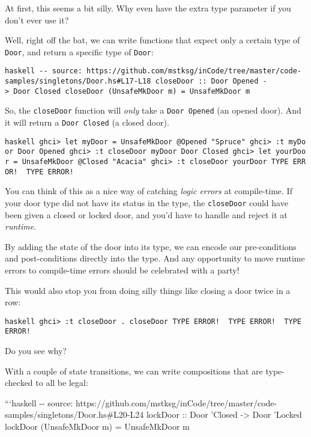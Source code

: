 \documentclass[]{article}
\begin{document}
At first, this seems a bit silly. Why even have the extra type parameter if you
don't ever use it?

Well, right off the bat, we can write functions that expect only a certain type
of \texttt{Door}, and return a specific type of \texttt{Door}:

\texttt{haskell\ -\/-\ source:\ https://github.com/mstksg/inCode/tree/master/code-samples/singletons/Door.hs\#L17-L18\ closeDoor\ ::\ Door\ \textquotesingle{}Opened\ -\textgreater{}\ Door\ \textquotesingle{}Closed\ closeDoor\ (UnsafeMkDoor\ m)\ =\ UnsafeMkDoor\ m}

So, the \texttt{closeDoor} function will \emph{only} take a
\texttt{Door\ \textquotesingle{}Opened} (an opened door). And it will return a
\texttt{Door\ \textquotesingle{}Closed} (a closed door).

\texttt{haskell\ ghci\textgreater{}\ let\ myDoor\ =\ UnsafeMkDoor\ @\textquotesingle{}Opened\ "Spruce"\ ghci\textgreater{}\ :t\ myDoor\ Door\ \textquotesingle{}Opened\ ghci\textgreater{}\ :t\ closeDoor\ myDoor\ Door\ \textquotesingle{}Closed\ ghci\textgreater{}\ let\ yourDoor\ =\ UnsafeMkDoor\ @\textquotesingle{}Closed\ "Acacia"\ ghci\textgreater{}\ :t\ closeDoor\ yourDoor\ TYPE\ ERROR!\ \ TYPE\ ERROR!}

You can think of this as a nice way of catching \emph{logic errors} at
compile-time. If your door type did not have its status in the type, the
\texttt{closeDoor} could have been given a closed or locked door, and you'd have
to handle and reject it at \emph{runtime}.

By adding the state of the door into its type, we can encode our pre-conditions
and post-conditions directly into the type. And any opportunity to move runtime
errors to compile-time errors should be celebrated with a party!

This would also stop you from doing silly things like closing a door twice in a
row:

\texttt{haskell\ ghci\textgreater{}\ :t\ closeDoor\ .\ closeDoor\ TYPE\ ERROR!\ \ TYPE\ ERROR!\ \ TYPE\ ERROR!}

Do you see why?

With a couple of state transitions, we can write compositions that are
type-checked to all be legal:

```haskell -\/- source:
https://github.com/mstksg/inCode/tree/master/code-samples/singletons/Door.hs\#L20-L24
lockDoor :: Door 'Closed -\textgreater{} Door 'Locked lockDoor (UnsafeMkDoor m)
= UnsafeMkDoor m
\end{document}
